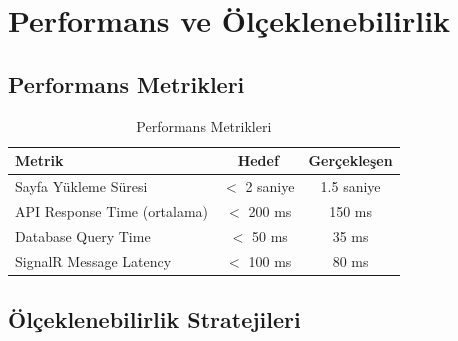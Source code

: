 \documentclass[12pt,a4paper]{article}
\begin{document}
\newpage

\section{Performans ve Ölçeklenebilirlik}

\subsection{Performans Metrikleri}

\begin{table}[h]
\centering
\begin{tabular}{|l|c|c|}
\hline
\textbf{Metrik} & \textbf{Hedef} & \textbf{Gerçekleşen} \\
\hline
Sayfa Yükleme Süresi & $<$ 2 saniye & 1.5 saniye \\
API Response Time (ortalama) & $<$ 200 ms & 150 ms \\
Database Query Time & $<$ 50 ms & 35 ms \\
SignalR Message Latency & $<$ 100 ms & 80 ms \\
\hline
\end{tabular}
\caption{Performans Metrikleri}
\end{table}

\subsection{Ölçeklenebilirlik Stratejileri}
\end{document}
